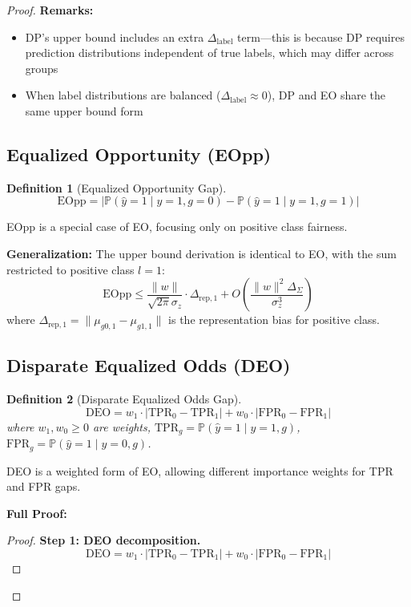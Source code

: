 \documentclass[11pt]{article}
\newtheorem{definition}{Definition}
\begin{document}
\begin{proof}
\textbf{Remarks:}
\begin{itemize}
    \item DP's upper bound includes an extra $\Delta_{\mathrm{label}}$ term---this is because DP requires prediction distributions independent of true labels, which may differ across groups
    \item When label distributions are balanced ($\Delta_{\mathrm{label}} \approx 0$), DP and EO share the same upper bound form
\end{itemize}

\subsection{Equalized Opportunity (EOpp)}

\begin{definition}[Equalized Opportunity Gap]
$$\mathrm{EOpp} = \left|\mathbb{P}(\hat{y}=1 \mid y=1, g=0) - \mathbb{P}(\hat{y}=1 \mid y=1, g=1)\right|$$
\end{definition}

EOpp is a special case of EO, focusing only on positive class fairness.

\textbf{Generalization:} The upper bound derivation is identical to EO, with the sum restricted to positive class $l=1$:
$$\mathrm{EOpp} \leq \frac{\|w\|}{\sqrt{2\pi}\sigma_z} \cdot \Delta_{\mathrm{rep},1} + O\left(\frac{\|w\|^2 \Delta_{\Sigma}}{\sigma_z^3}\right)$$
where $\Delta_{\mathrm{rep},1} = \|\mu_{g0,1} - \mu_{g1,1}\|$ is the representation bias for positive class.

\subsection{Disparate Equalized Odds (DEO)}

\begin{definition}[Disparate Equalized Odds Gap]
$$\mathrm{DEO} = w_1 \cdot |\mathrm{TPR}_0 - \mathrm{TPR}_1| + w_0 \cdot |\mathrm{FPR}_0 - \mathrm{FPR}_1|$$
where $w_1, w_0 \geq 0$ are weights, $\mathrm{TPR}_g = \mathbb{P}(\hat{y}=1 \mid y=1, g)$, $\mathrm{FPR}_g = \mathbb{P}(\hat{y}=1 \mid y=0, g)$.
\end{definition}

DEO is a weighted form of EO, allowing different importance weights for TPR and FPR gaps.

\textbf{Full Proof:}

\begin{proof}
\textbf{Step 1: DEO decomposition.}
$$\mathrm{DEO} = w_1 \cdot |\mathrm{TPR}_0 - \mathrm{TPR}_1| + w_0 \cdot |\mathrm{FPR}_0 - \mathrm{FPR}_1|$$


\end{proof}
\end{proof}
\end{document}
